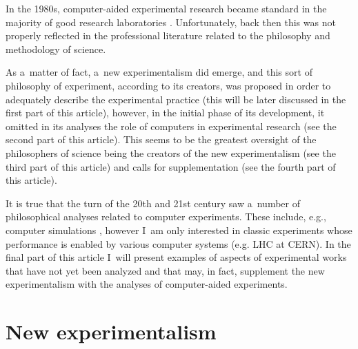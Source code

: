 In the 1980s, computer-aided experimental research became standard in the majority of good research laboratories 
\parencite[][]{crowley-milling_computer_1974}. %
 Unfortunately, back then this was not properly reflected in the professional literature related to the philosophy and methodology of science.



As a~matter of fact, a~new experimentalism did emerge, and this sort of philosophy of experiment, according to its creators, was proposed in order to adequately describe the experimental practice (this will be later discussed in the first part of this article), however, in the initial phase of its development, it omitted in its analyses the role of computers in experimental research (see the second part of this article). This seems to be the greatest oversight of the philosophers of science being the creators of the new experimentalism (see the third part of this article) and calls for supplementation (see the fourth part of this article).



It is true that the turn of the 20th and 21st century saw a~number of philosophical analyses related to computer experiments. These include, e.g., computer simulations 
\parencites[][]{bartz-beielstein_new_2005}[][]{giere_is_2009}[][]{guala_models_2002}[][]{morgan_ising_1999}[][]{humphreys_computational_1995}[][]{morgan_experiments_2003}[][]{peschard_modeling_2009}[][]{winsberg_science_2010}[][]{burge_computer_1998}[][]{epstein_agent-based_1999}[][]{hartmann_world_1996}[][]{lenhard_computer_2007}[][]{morrison_models_2009}[][]{parker_computer_2013}, %
 however I~am only interested in classic experiments whose performance is enabled by various computer systems (e.g. LHC at CERN). In the final part of this article I~will present examples of aspects of experimental works that have not yet been analyzed and that may, in fact, supplement the new experimentalism with the analyses of computer-aided experiments.



\section{New experimentalism}

